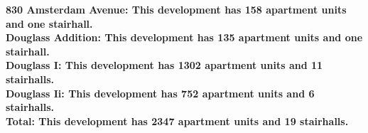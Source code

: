 \bf{830 Amsterdam Avenue}: This development has 158 apartment units and one stairhall.\\\bf{Douglass Addition}: This development has 135 apartment units and one stairhall.\\\bf{Douglass I}: This development has 1302 apartment units and 11 stairhalls.\\\bf{Douglass Ii}: This development has 752 apartment units and 6 stairhalls.\\\bf{Total}: This development has 2347 apartment units and 19 stairhalls.\\
